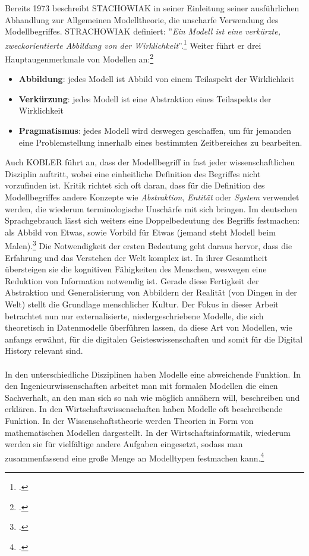 \documentclass[12pt,a4paper]{article}
\begin{document}
Bereits 1973 beschreibt STACHOWIAK in seiner Einleitung seiner ausführlichen Abhandlung zur Allgemeinen Modelltheorie, die unscharfe Verwendung des Modellbegriffes. STRACHOWIAK definiert: ''\textit{Ein Modell ist eine verkürzte, zweckorientierte Abbildung von der Wirklichkeit}''.\footcite[][S.]{stachowiak1973allgemeine} Weiter führt er drei Hauptaugenmerkmale von Modellen an:\footcite[][S.131–133]{stachowiak1973allgemeine}
\begin{itemize}
\item \textbf{Abbildung}: jedes Modell ist Abbild von einem Teilaspekt der Wirklichkeit
\item \textbf{Verkürzung}: jedes Modell ist eine Abstraktion eines Teilaspekts der Wirklichkeit
\item \textbf{Pragmatismus}: jedes Modell wird deswegen geschaffen, um für jemanden eine Problemstellung innerhalb eines bestimmten Zeitbereiches zu bearbeiten.
\end{itemize}
Auch KOBLER führt an, dass der Modellbegriff in fast jeder wissenschaftlichen Disziplin auftritt, wobei eine einheitliche Definition des Begriffes nicht vorzufinden ist. Kritik richtet sich oft daran, dass für die Definition des Modellbegriffes andere Konzepte wie \textit{Abstraktion}, \textit{Entität} oder \textit{System} verwendet werden, die wiederum terminologische Unschärfe mit sich bringen. Im deutschen Sprachgebrauch lässt sich weiters eine Doppelbedeutung des Begriffs festmachen: als Abbild von Etwas, sowie Vorbild für Etwas (jemand steht Modell beim Malen).\footcite[][S.129]{stachowiak1973allgemeine} Die Notwendigkeit der ersten Bedeutung geht daraus hervor, dass die Erfahrung und das Verstehen der Welt komplex ist. In ihrer Gesamtheit übersteigen sie die kognitiven Fähigkeiten des Menschen, weswegen eine Reduktion von Information notwendig ist. Gerade diese Fertigkeit der Abstraktion und Generalisierung von Abbildern der Realität (von Dingen in der Welt) stellt die Grundlage menschlicher Kultur. Der Fokus in dieser Arbeit betrachtet nun nur externalisierte, niedergeschriebene Modelle, die sich theoretisch in Datenmodelle überführen lassen, da diese Art von Modellen, wie anfangs erwähnt, für die digitalen Geisteswissenschaften und somit für die Digital History relevant sind.
\\
\\
In den unterschiedliche Disziplinen haben Modelle eine abweichende Funktion. In den Ingenieurwissenschaften arbeitet man mit formalen Modellen die einen Sachverhalt, an den man sich so nah wie möglich annähern will, beschreiben und erklären. In den Wirtschaftswissenschaften haben Modelle oft beschreibende Funktion. In der Wissenschaftstheorie werden Theorien in Form von mathematischen Modellen dargestellt. In der Wirtschaftsinformatik, wiederum werden sie für vielfältige andere Aufgaben eingesetzt, sodass man zusammenfassend eine große Menge an Modelltypen festmachen kann.\footcite[][S.41-44]{kobler2010qualitat}
\end{document}
